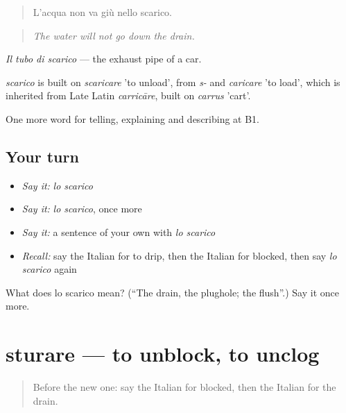 \begin{quote}
L'acqua non va giù nello scarico.
\end{quote}

\begin{quote}
\emph{The water will not go down the drain.}
\end{quote}

\emph{Il tubo di scarico} — the exhaust pipe of a car.

\begin{cousinweb}
\emph{scarico} is built on \emph{scaricare} 'to unload', from \emph{s-} and \emph{caricare} 'to load', which is inherited from Late Latin \emph{carricāre}, built on \emph{carrus} 'cart'.
\end{cousinweb}

\begin{grammarlens}[title={What you've built}]
One more word for telling, explaining and describing at B1.
\end{grammarlens}

\subsection*{Your turn}
\begin{itemize}
\raggedright
  \item \emph{Say it:} \emph{lo scarico}
  \item \emph{Say it:} \emph{lo scarico}, once more
  \item \emph{Say it:} a sentence of your own with \emph{lo scarico}
  \item \emph{Recall:} say the Italian for to drip, then the Italian for blocked, then say \emph{lo scarico} again
\end{itemize}

\begin{tcolorbox}[breakable,colback=teal!4,colframe=teal!35!black,title={Before you move on}]
What does lo scarico mean? (\textquotedblleft{}The drain, the plughole; the flush\textquotedblright{}.) Say it once more.
\end{tcolorbox}
\section[sturare]{sturare — to unblock, to unclog}

\label{lesson:IT-C434-sturare}



\begin{quote}
Before the new one: say the Italian for blocked, then the Italian for the drain.
\end{quote}

